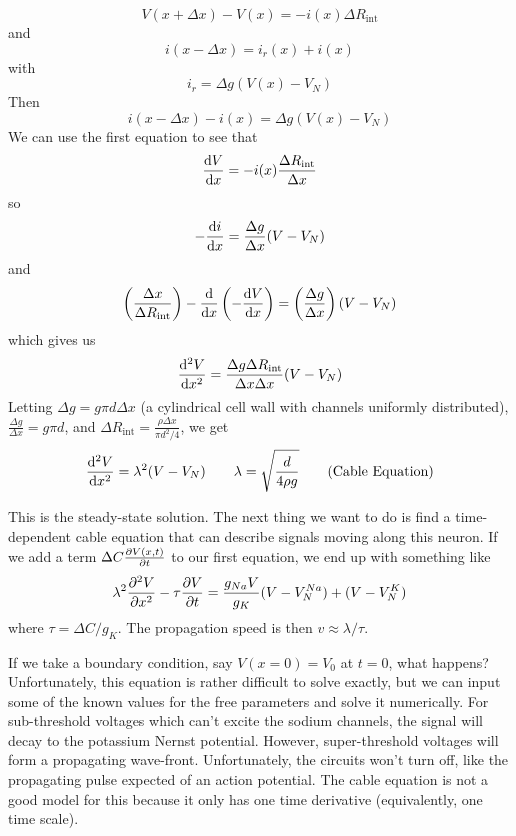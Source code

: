 \documentclass[a4paper,twoside,master.tex]{subfiles}
\begin{document}
\begin{equation}
    V(x + \Delta x) - V(x) = - i(x) \Delta R_{\text{int}}
\end{equation}
and
\begin{equation}
    i(x - \Delta x) = i_r(x) + i(x)
\end{equation}
with
\begin{equation}
    i_r = \Delta g(V(x) - V_N)
\end{equation}
Then
\begin{equation}
    i(x - \Delta x) - i(x) = \Delta g (V(x) - V_N)
\end{equation}
We can use the first equation to see that
\begin{equation}
    \dv{V}{x} = - i(x) \frac{\Delta R_{\text{int}}}{\Delta x}
\end{equation}
so
\begin{equation}
    -\dv{i}{x} = \frac{\Delta g}{\Delta x} (V - V_N)
\end{equation}
and
\begin{equation}
    \left( \frac{\Delta x}{\Delta R_{\text{int}}} \right) - \dv{x}\left( - \dv{V}{x} \right) = \left( \frac{\Delta g}{\Delta x} \right)(V - V_N)
\end{equation}
which gives us
\begin{equation}
    \dv[2]{V}{x} = \frac{\Delta g \Delta R_{\text{int}}}{\Delta x \Delta x} (V - V_N)
\end{equation}
Letting $ \Delta g = g \pi d \Delta x $ (a cylindrical cell wall with channels uniformly distributed), $ \frac{\Delta g}{\Delta x} = g \pi d $, and $ \Delta R_{\text{int}} = \frac{\rho \Delta x}{\pi d^2 / 4} $, we get
\begin{equation}
    \dv[2]{V}{x} = \lambda^2 (V - V_N) \qquad \lambda = \sqrt{\frac{d}{4 \rho g}} \tag{Cable Equation}
\end{equation}

This is the steady-state solution. The next thing we want to do is find a time-dependent cable equation that can describe signals moving along this neuron. If we add a term $ \Delta C \pdv{V(x,t)}{t} $ to our first equation, we end up with something like
\begin{equation}
    \lambda^2 \pdv[2]{V}{x} - \tau \pdv{V}{t} = \frac{g_{Na} V}{g_K} (V - V_N^{Na})+ (V - V_N^{K})
\end{equation}
where $ \tau = \Delta C / g_K $. The propagation speed is then $ v \approx \lambda / \tau $.

If we take a boundary condition, say $ V(x=0) = V_0 $ at $ t = 0 $, what happens? Unfortunately, this equation is rather difficult to solve exactly, but we can input some of the known values for the free parameters and solve it numerically. For sub-threshold voltages which can't excite the sodium channels, the signal will decay to the potassium Nernst potential. However, super-threshold voltages will form a propagating wave-front. Unfortunately, the circuits won't turn off, like the propagating pulse expected of an action potential. The cable equation is not a good model for this because it only has one time derivative (equivalently, one time scale).
\end{document}

